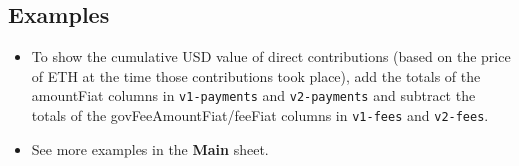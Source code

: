 \documentclass{article}
\begin{document}
\subsection{Examples}

\begin{itemize}
\item To show the cumulative USD value of direct contributions (based on the price of ETH at the time those contributions took place), add the totals of the amountFiat columns in \texttt{v1-payments} and \texttt{v2-payments} and subtract the totals of the govFeeAmountFiat/feeFiat columns in \texttt{v1-fees} and \texttt{v2-fees}.
\item See more examples in the \textbf{Main} sheet.
\end{itemize}
\end{document}
